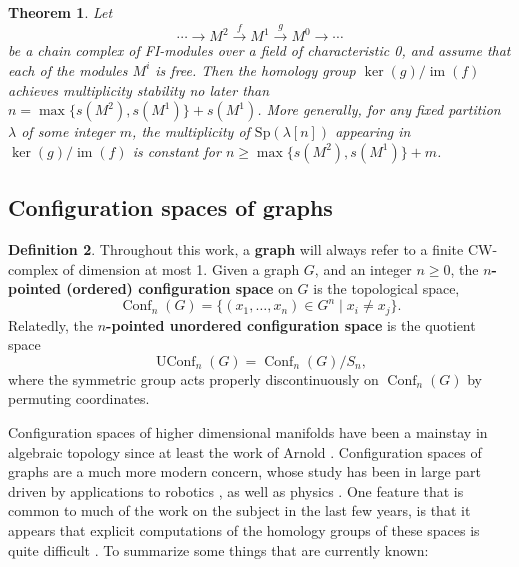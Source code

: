 \documentclass[12pt]{amsart}
\newtheorem{thm}{Theorem}[section]
\theoremstyle{definition}
\newtheorem{defn}[thm]{Definition}
\newcommand{\conf}{\operatorname{Conf}}
\newcommand{\uconf}{\operatorname{UConf}}
\newcommand{\im}{\operatorname{im}}
\newcommand{\Sp}{\mathrm{Sp}}
\begin{document}
\begin{thm} \cite[Proposition 3.3.3 and Lemma 6.3.2]{CEF} \label{relationBound}
Let
\[
\cdots \rightarrow M^2 \stackrel{f}\rightarrow M^1 \stackrel{g}\rightarrow M^0 \rightarrow \cdots
\]
be a chain complex of FI-modules over a field of characteristic 0, and assume that each of the modules $M^i$ is free. Then the homology group $\ker(g)/\im(f)$ achieves multiplicity stability no later than $n = \max\{s(M^2),s(M^1)\} + s(M^1)$. More generally, for any fixed partition $\lambda$ of some integer $m$, the multiplicity of $
\Sp(\lambda[n])$ appearing in $\ker(g)/\im(f)$ is constant for $n \geq \max\{s(M^2),s(M^1)\} + m$.
\end{thm}

\subsection{Configuration spaces of graphs}\label{section:confbackground}

\begin{defn}
Throughout this work, a \textbf{graph} will always refer to a finite CW-complex of dimension at most 1. Given a graph $G$, and an integer $n \geq 0$, the \textbf{$n$-pointed (ordered) configuration space} on $G$ is the topological space,
\[
\conf_n(G) = \{(x_1,\ldots,x_n) \in G^n \mid x_i \neq x_j\}.
\]
Relatedly, the \textbf{$n$-pointed unordered configuration space} is the quotient space
\[
\uconf_n(G) = \conf_n(G)/S_n,
\]
where the symmetric group acts properly discontinuously on $\conf_n(G)$ by permuting coordinates.
\end{defn}

Configuration spaces of higher dimensional manifolds have been a mainstay in algebraic topology since at least the work of Arnold \cite{Arn}. Configuration spaces of graphs are a much more modern concern, whose study has been in large part driven by applications to robotics \cite{abrams-ghrist,FarBook,Ghr}, as well as physics \cite{Mac,MS}. One feature that is common to much of the work on the subject in the last few years, is that it appears that explicit computations of the homology groups of these spaces is quite difficult \cite{ADCK,AK,BF,CL,Drum,Farl,FH}. To summarize some things that are currently known:
\end{document}
